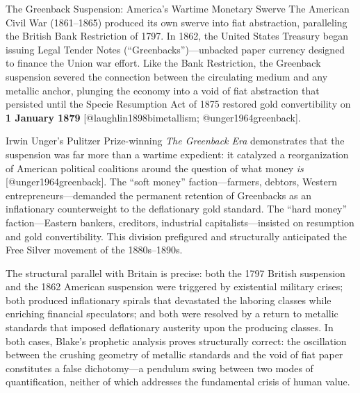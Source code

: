 \documentclass[
  ignorenonframetext,
]{beamer}
\begin{document}
\begin{frame}{The Greenback Suspension: America's Wartime Monetary
Swerve}
\protect{}\label{the-greenback-suspension-americas-wartime-monetary-swerve}
The American Civil War (1861--1865) produced its own swerve into fiat
abstraction, paralleling the British Bank Restriction of 1797. In 1862,
the United States Treasury began issuing Legal Tender Notes
(``Greenbacks'')---unbacked paper currency designed to finance the Union
war effort. Like the Bank Restriction, the Greenback suspension severed
the connection between the circulating medium and any metallic anchor,
plunging the economy into a void of fiat abstraction that persisted
until the Specie Resumption Act of 1875 restored gold convertibility on
\textbf{1 January 1879} {[}@laughlin1898bimetallism;
@unger1964greenback{]}.

Irwin Unger's Pulitzer Prize-winning \emph{The Greenback Era}
demonstrates that the suspension was far more than a wartime expedient:
it catalyzed a reorganization of American political coalitions around
the question of what money \emph{is} {[}@unger1964greenback{]}. The
``soft money'' faction---farmers, debtors, Western
entrepreneurs---demanded the permanent retention of Greenbacks as an
inflationary counterweight to the deflationary gold standard. The ``hard
money'' faction---Eastern bankers, creditors, industrial
capitalists---insisted on resumption and gold convertibility. This
division prefigured and structurally anticipated the Free Silver
movement of the 1880s--1890s.

The structural parallel with Britain is precise: both the 1797 British
suspension and the 1862 American suspension were triggered by
existential military crises; both produced inflationary spirals that
devastated the laboring classes while enriching financial speculators;
and both were resolved by a return to metallic standards that imposed
deflationary austerity upon the producing classes. In both cases,
Blake's prophetic analysis proves structurally correct: the oscillation
between the crushing geometry of metallic standards and the void of fiat
paper constitutes a false dichotomy---a pendulum swing between two modes
of quantification, neither of which addresses the fundamental crisis of
human value.
\end{frame}
\end{document}
